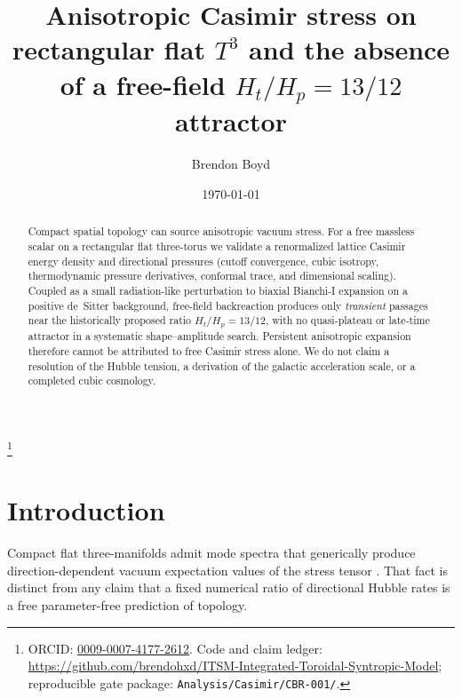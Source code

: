 \documentclass[aps,prd,reprint,superscriptaddress,nofootinbib,floatfix]{revtex4-2}
\newcommand{\Tthree}{T^{3}}
\newcommand{\Ht}{H_{t}}
\newcommand{\Hp}{H_{p}}
\begin{document}
\title{Anisotropic Casimir stress on rectangular flat
\texorpdfstring{\(\Tthree\)}{T3} and the absence of a free-field
\texorpdfstring{\(\Ht/\Hp=13/12\)}{Ht/Hp=13/12} attractor}

\author{Brendon Boyd}
\thanks{ORCID: \href{https://orcid.org/0009-0007-4177-2612}{0009-0007-4177-2612}.
Code and claim ledger:
\url{https://github.com/brendohxd/ITSM-Integrated-Toroidal-Syntropic-Model};
reproducible gate package: \texttt{Analysis/Casimir/CBR-001/}.}

\date{\today}

\begin{abstract}
Compact spatial topology can source anisotropic vacuum stress.
For a free massless scalar on a rectangular flat three-torus we validate a
renormalized lattice Casimir energy density and directional pressures
(cutoff convergence, cubic isotropy, thermodynamic pressure derivatives,
conformal trace, and dimensional scaling).
Coupled as a small radiation-like perturbation to biaxial Bianchi-I expansion
on a positive de~Sitter background, free-field backreaction produces only
\emph{transient} passages near the historically proposed ratio
\(\Ht/\Hp=13/12\), with no quasi-plateau or late-time attractor in a
systematic shape--amplitude search.
Persistent anisotropic expansion therefore cannot be attributed to free
Casimir stress alone.
We do not claim a resolution of the Hubble tension, a derivation of the
galactic acceleration scale, or a completed cubic cosmology.
\end{abstract}


\maketitle

\section{Introduction}
\label{sec:intro}

Compact flat three-manifolds admit mode spectra that generically produce
direction-dependent vacuum expectation values of the stress tensor
\cite{birrell_davies_1982,lachieze_luminet_1995,edery2006}.
That fact is distinct from any claim that a fixed numerical ratio of
directional Hubble rates is a free parameter-free prediction of topology.
\end{document}

